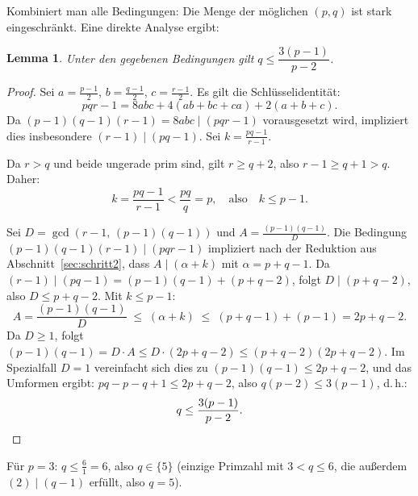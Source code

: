 \documentclass[12pt,a4paper]{amsart}
\newtheorem{lemma}[theorem]{Lemma}
\theoremstyle{definition}
\begin{document}
\medskip
Kombiniert man alle Bedingungen: Die Menge der möglichen $(p, q)$ ist stark
eingeschränkt. Eine direkte Analyse ergibt:

\begin{lemma}
\label{lem:grenze_q}
Unter den gegebenen Bedingungen gilt $q \le \dfrac{3(p-1)}{p-2}$.
\end{lemma}

\begin{proof}
Sei $a = \tfrac{p-1}{2}$, $b = \tfrac{q-1}{2}$, $c = \tfrac{r-1}{2}$.
Es gilt die Schlüsselidentität:
\[
  pqr - 1 = 8abc + 4(ab + bc + ca) + 2(a + b + c).
\]
Da $(p-1)(q-1)(r-1) = 8abc \mid (pqr - 1)$ vorausgesetzt wird, impliziert dies insbesondere
$(r-1) \mid (pq - 1)$. Sei $k = \tfrac{pq-1}{r-1}$.

Da $r > q$ und beide ungerade prim sind, gilt $r \ge q + 2$, also $r - 1 \ge q + 1 > q$.
Daher:
\[
  k = \frac{pq - 1}{r - 1} < \frac{pq}{q} = p, \quad\text{also}\quad k \le p - 1.
\]

Sei $D = \gcd(r-1,\, (p-1)(q-1))$ und $A = \tfrac{(p-1)(q-1)}{D}$.
Die Bedingung $(p-1)(q-1)(r-1) \mid (pqr-1)$ impliziert nach der Reduktion aus
Abschnitt~\ref{sec:schritt2}, dass $A \mid (\alpha + k)$ mit $\alpha = p + q - 1$.
Da $(r-1) \mid (pq-1) = (p-1)(q-1) + (p+q-2)$, folgt $D \mid (p+q-2)$,
also $D \le p+q-2$. Mit $k \le p - 1$:
\[
  A = \frac{(p-1)(q-1)}{D} \;\le\; (\alpha + k) \;\le\; (p + q - 1) + (p - 1) = 2p + q - 2.
\]
Da $D \ge 1$, folgt $(p-1)(q-1) = D \cdot A \le D \cdot (2p+q-2) \le (p+q-2)(2p+q-2)$.
Im Spezialfall $D = 1$ vereinfacht sich dies zu $(p-1)(q-1) \le 2p+q-2$,
und das Umformen ergibt: $pq - p - q + 1 \le 2p + q - 2$, also $q(p-2) \le 3(p-1)$, d.\,h.:
\[
  q \le \frac{3(p-1)}{p-2}. \qedhere
\]
\end{proof}

Für $p = 3$: $q \le \tfrac{6}{1} = 6$, also $q \in \{5\}$ (einzige Primzahl mit $3 < q \le 6$, die außerdem $(2) \mid (q-1)$ erfüllt, also $q = 5$).
\end{document}
